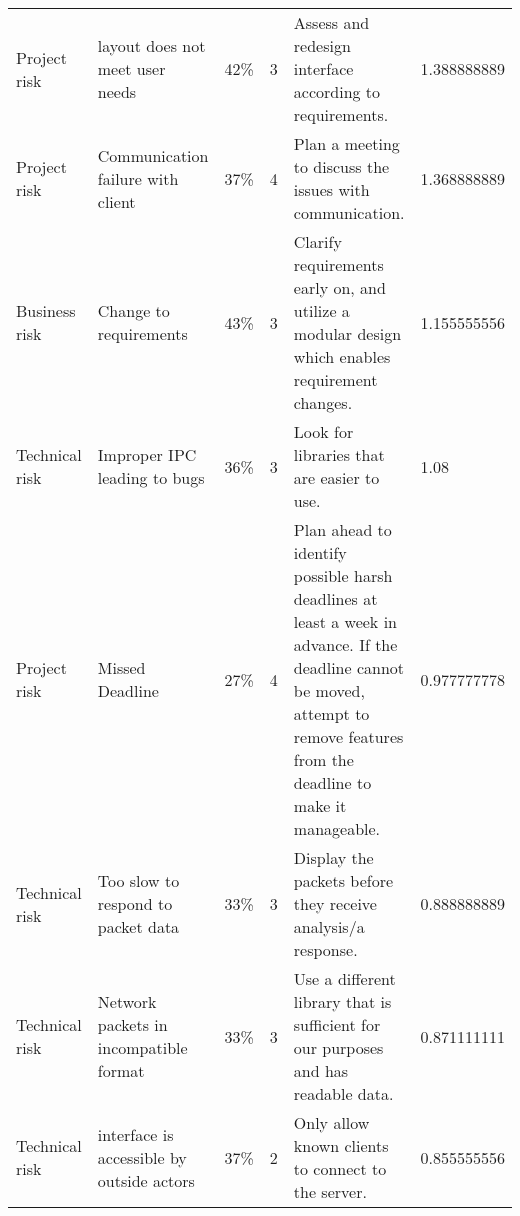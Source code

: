 \documentclass{article}
\begin{document}
\begin{table}[]
\begin{tabular}{llllll}
    Project risk   & layout does not meet user needs                       & 42\%        & 3      & Assess and redesign interface according to requirements.                                                                                                                         & 1.388888889   \\
    Project risk   & Communication failure with client                     & 37\%        & 4      & Plan a meeting to discuss the issues with communication.                                                                                                                         & 1.368888889   \\
    Business risk  & Change to requirements                                & 43\%        & 3      & Clarify requirements early on, and utilize a modular design which enables requirement changes.                                                                                   & 1.155555556   \\
    Technical risk & Improper IPC leading to bugs                          & 36\%        & 3      & Look for libraries that are easier to use.                                                                                                                                       & 1.08          \\
    Project risk   & Missed Deadline                                       & 27\%        & 4      & Plan ahead to identify possible harsh deadlines at least a week in advance. If the deadline cannot be moved, attempt to remove features from the deadline to make it manageable. & 0.977777778   \\
    Technical risk & Too slow to respond to packet data                    & 33\%        & 3      & Display the packets before they receive analysis/a response.                                                                                                                     & 0.888888889   \\
    Technical risk & Network packets in incompatible format                & 33\%        & 3      & Use a different library that is sufficient for our purposes and has readable data.                                                                                               & 0.871111111   \\
    Technical risk & interface is accessible by outside actors             & 37\%        & 2      & Only allow known clients to connect to the server.                                                                                                                               & 0.855555556   \\

\end{tabular}
\end{table}
\end{document}
